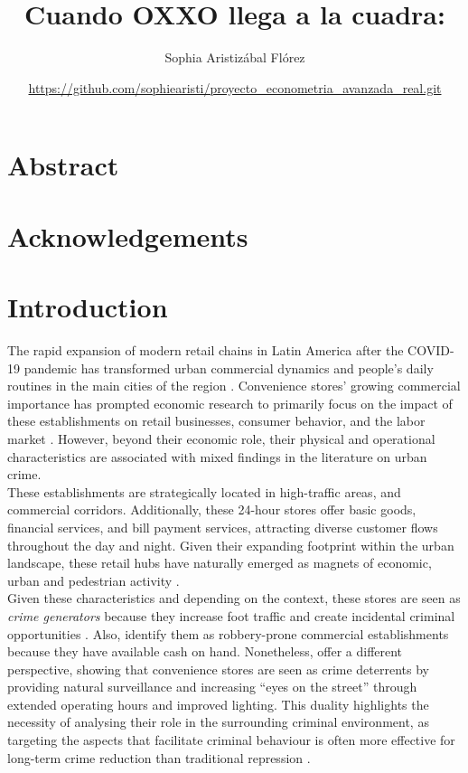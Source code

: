 \documentclass[12pt]{article}
\title{Cuando OXXO llega a la cuadra: }
\author{Sophia Aristizábal Flórez}
\date{\small{\url{https://github.com/sophiearisti/proyecto_econometria_avanzada_real.git}}}
\begin{document}
\maketitle
\onehalfspacing

\section{Abstract}

\newpage

\section{Acknowledgements}

\newpage

\section{Introduction}

The rapid expansion of modern retail chains in Latin America after the COVID-19 pandemic has transformed urban commercial dynamics and people's daily routines in the main cities of the region \parencite{Antom2024,McKinsey2024,MDPI2021}. Convenience stores’ growing commercial importance has prompted economic research to primarily focus on the impact of these establishments on retail businesses, consumer behavior, and the labor market \parencite{delgado2024}. However, beyond their economic role, their physical and operational characteristics are associated with mixed findings in the literature on urban crime.\\ 

These establishments are strategically located in high-traffic areas, and commercial corridors. Additionally, these 24-hour stores offer basic goods, financial services, and bill payment services, attracting diverse customer flows throughout the day and night. Given their expanding footprint within the urban landscape, these retail hubs have naturally emerged as magnets of economic, urban and pedestrian activity \parencite{Dugato2026,marcos2022}.\\

Given these characteristics and depending on the context, these stores are seen as \textit{crime generators} because they increase foot traffic and create incidental criminal opportunities \parencite{Dugato2026}. Also, \cite{Wellford1997} identify them as robbery-prone commercial establishments because they have available cash on hand. Nonetheless, \cite{Davis2021} offer a different perspective, showing that convenience stores are seen as crime deterrents by providing natural surveillance and increasing “eyes on the street” through extended operating hours and improved lighting. This duality highlights the necessity of analysing their role in the surrounding criminal environment, as targeting the aspects that facilitate criminal behaviour is often more effective for long-term crime reduction than traditional repression \parencite{Dugato2026}.\\
\end{document}
